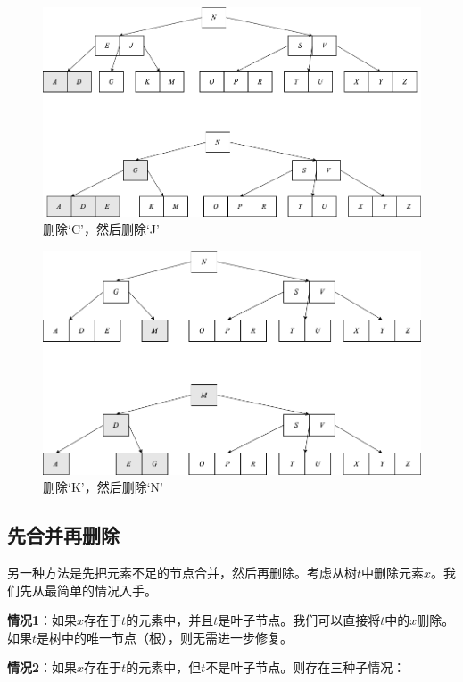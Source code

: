 \documentclass{ctexart}
\begin{document}
\begin{figure}[htbp]
  \centering
  \includegraphics[scale=0.33]{img/btree-del-CJ.png}
  \caption{删除`C'，然后删除`J'}
  \label{fig:btree-del-CJ}
\end{figure}

\begin{figure}[htbp]
  \centering
  \includegraphics[scale=0.33]{img/btree-del-KN.png}
  \caption{删除`K'，然后删除`N'}
  \label{fig:btree-del-KN}
\end{figure}

\subsection{先合并再删除}

另一种方法是先把元素不足的节点合并，然后再删除。考虑从树$t$中删除元素$x$。我们先从最简单的情况入手。

\textbf{情况1}：如果$x$存在于$t$的元素中，并且$t$是叶子节点。我们可以直接将$t$中的$x$删除。如果$t$是树中的唯一节点（根），则无需进一步修复。

\textbf{情况2}：如果$x$存在于$t$的元素中，但$t$不是叶子节点。则存在三种子情况：
\end{document}
